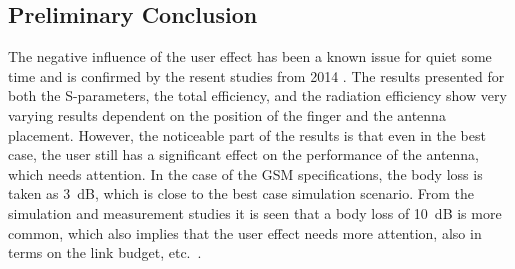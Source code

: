 \subsection{Preliminary Conclusion}
The negative influence of the user effect has been a known issue for quiet some time and is confirmed by the resent studies from 2014 \cite{Samantha2014UserEff}. The results presented for both the S-parameters, the total efficiency, and the radiation efficiency show very varying results dependent on the position of the finger and the antenna placement. However, the noticeable part of the results is that even in the best case, the user still has a significant effect on the performance of the antenna, which needs attention. In the case of the GSM specifications, the body loss is taken as \SI{3}{dB}, which is close to the best case simulation scenario. From the simulation and measurement studies it is seen that a body loss of \SI{10}{dB} is more common, which also implies that the user effect needs more attention, also in terms on the link budget, etc.\ \cite{sanchez2008multiband}.
